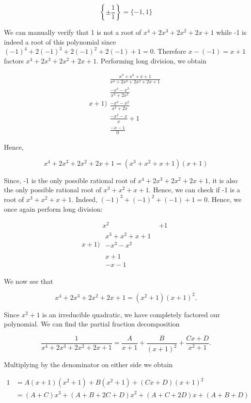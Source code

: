 \documentclass[10pt]{article}
\begin{document}
$$
\left\{ \pm \frac{1}{1}\right\}=\{-1,1\}
$$

We can manually verify that 1 is not a root of $x^{4}+2 x^{3}+2 x^{2}+2 x+1$ while -1 is indeed a root of this polynomial since $(-1)^{4}+2(-1)^{3}+2(-1)^{2}+2(-1)+1=0$. Therefore $x-(-1)=x+1$ factors $x^{4}+2 x^{3}+2 x^{2}+2 x+1$. Performing long division, we obtain

$$
x+1) \begin{array}{r}
\frac{x^{3}+x^{2}+x+1}{x^{4}+2 x^{3}+2 x^{2}+2 x+1} \\
\frac{-x^{4}-x^{3}}{x^{3}+2 x^{2}} \\
\frac{-x^{3}-x^{2}}{x^{2}+2 x} \\
\frac{-x^{2}-x}{x}+1 \\
\frac{-x-1}{0}
\end{array}
$$

Hence,

$$
x^{4}+2 x^{3}+2 x^{2}+2 x+1=\left(x^{3}+x^{2}+x+1\right)(x+1)
$$

Since, -1 is the only possible rational root of $x^{4}+2 x^{3}+2 x^{2}+2 x+1$, it is also the only possible rational root of $x^{3}+x^{2}+x+1$. Hence, we can check if -1 is a root of $x^{3}+x^{2}+x+1$. Indeed, $(-1)^{3}+(-1)^{2}+(-1)+1=0$. Hence, we once again perform long division:

$$
x+1) \begin{array}{rr}
x^{2} & +1 \\
\begin{array}{r}
x^{3}+x^{2}+x+1 \\
-x^{3}-x^{2}
\end{array} \\
\begin{array}{r}
x+1 \\
-x-1
\end{array}
\end{array}
$$

We now see that

$$
x^{4}+2 x^{3}+2 x^{2}+2 x+1=\left(x^{2}+1\right)(x+1)^{2} .
$$

Since $x^{2}+1$ is an irreducible quadratic, we have completely factored our polynomial. We can find the partial fraction decomposition

$$
\frac{1}{x^{4}+2 x^{3}+2 x^{2}+2 x+1}=\frac{A}{x+1}+\frac{B}{(x+1)^{2}}+\frac{C x+D}{x^{2}+1} .
$$

Multiplying by the denominator on either side we obtain

$$
\begin{aligned}
1 & =A(x+1)\left(x^{2}+1\right)+B\left(x^{2}+1\right)+(C x+D)(x+1)^{2} \\
& =(A+C) x^{3}+(A+B+2 C+D) x^{2}+(A+C+2 D) x+(A+B+D)
\end{aligned}
$$
\end{document}
